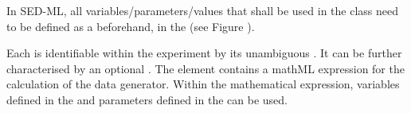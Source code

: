 \label{sec:listOfDataGenerators}


In SED-ML, all variables/parameters/values that shall be used in the  class need  to be defined as a  beforehand, in the  (see Figure ). 

%


Each  is identifiable within the experiment by its unambiguous . It can be further characterised by an optional . The  element contains a mathML expression for the calculation of the data generator. Within the mathematical expression, variables defined in the  and parameters defined in the  can be used.


